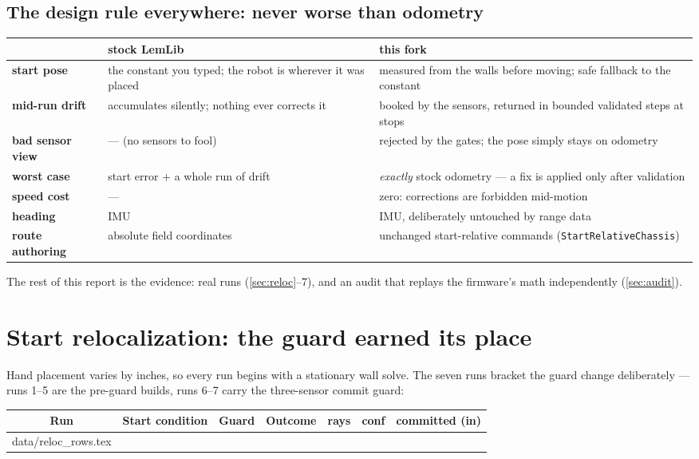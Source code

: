 \documentclass[11pt]{article}
\makeatletter
\newcommand{\rawinput}[1]{\@@input #1 }
\makeatother
\begin{document}
\subsection{The design rule everywhere: never worse than odometry}
\begin{center}\footnotesize
{}
\begin{tabular}{@{}>{\bfseries}p{2.35cm} p{6.1cm} p{6.7cm}@{}}
\toprule
 & {\normalfont\color{subink}stock LemLib} & {\color{filt}this fork}\\
\midrule
start pose & the constant you typed; the robot is wherever it was placed & measured from the walls before moving; safe fallback to the constant\\
mid-run drift & accumulates silently; nothing ever corrects it & booked by the sensors, returned in bounded validated steps at stops\\
bad sensor view & --- (no sensors to fool) & rejected by the gates; the pose simply stays on odometry\\
worst case & start error $+$ a whole run of drift & \emph{exactly} stock odometry --- a fix is applied only after validation\\
speed cost & --- & zero: corrections are forbidden mid-motion\\
heading & IMU & IMU, deliberately untouched by range data\\
route authoring & absolute field coordinates & unchanged start-relative commands (\texttt{StartRelativeChassis})\\
\bottomrule
\end{tabular}
\end{center}
The rest of this report is the evidence: real runs (\autoref{sec:reloc}--7), and an
audit that replays the firmware's math independently (\autoref{sec:audit}).

\section{Start relocalization: the guard earned its place}\label{sec:reloc}
Hand placement varies by inches, so every run begins with a stationary wall solve.
The seven runs bracket the guard change deliberately --- runs 1--5 are the pre-guard
builds, runs 6--7 carry the three-sensor commit guard:

\begin{center}\footnotesize
{}
\begin{tabular}{c l c l S[table-format=1.0] S[table-format=1.2] l}
\toprule
\textbf{Run} & \textbf{Start condition} & \textbf{Guard} & \textbf{Outcome} &
{\textbf{rays}} & {\textbf{conf}} & \textbf{committed (in)}\\
\midrule
\rawinput{data/reloc_rows.tex}
\bottomrule
\end{tabular}
\end{center}
\end{document}
